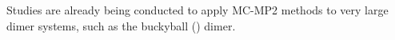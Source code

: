 
Studies are already being conducted to apply MC-MP2 methods to
very large dimer systems, such as the buckyball () dimer.
